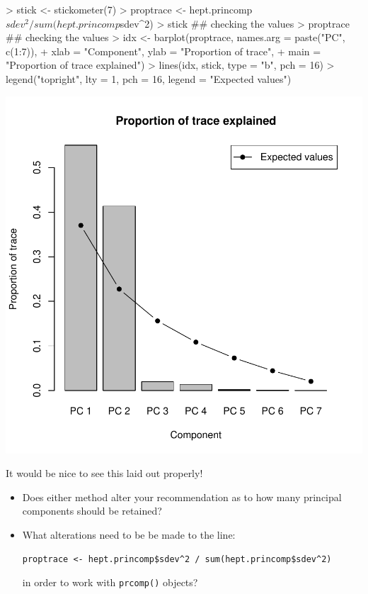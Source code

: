 \documentclass[11pt]{article}
\begin{document}
\begin{Schunk}
\begin{Sinput}
>  stick <- stickometer(7)
>  proptrace <- hept.princomp$sdev^2 / sum(hept.princomp$sdev^2)
>  stick ## checking the values
>  proptrace ## checking the values
>  idx <- barplot(proptrace, names.arg = paste("PC", c(1:7)), 
+  xlab = "Component", ylab = "Proportion of trace", 
+  main = "Proportion of trace explained")
>  lines(idx, stick, type = "b", pch = 16)
>  legend("topright", lty = 1, pch = 16, legend = "Expected values")
\end{Sinput}
\end{Schunk}
\includegraphics{STAT3401Week5PCAlab-stickhept}

It would be nice to see this laid out properly!


\begin{itemize}
\item Does either method alter your recommendation as to how many principal components should be retained?
\item What alterations need to be be made to the line:
\begin{verbatim}
proptrace <- hept.princomp$sdev^2 / sum(hept.princomp$sdev^2)
\end{verbatim}
in order to work with \texttt{prcomp()} objects?
\end{itemize}
\end{document}
